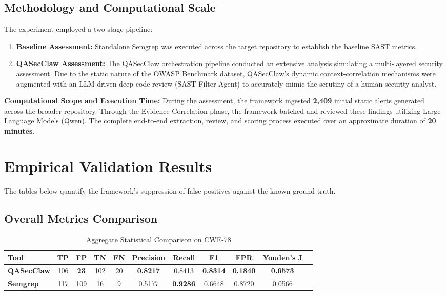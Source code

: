 \documentclass[11pt,a4paper]{article}
\begin{document}
\subsection{Methodology and Computational Scale}
The experiment employed a two-stage pipeline:
\begin{enumerate}
    \item \textbf{Baseline Assessment:} Standalone Semgrep was executed across the target repository to establish the baseline SAST metrics.
    \item \textbf{QASecClaw Assessment:} The QASecClaw orchestration pipeline conducted an extensive analysis simulating a multi-layered security assessment. Due to the static nature of the OWASP Benchmark dataset, QASecClaw's dynamic context-correlation mechanisms were augmented with an LLM-driven deep code review (SAST Filter Agent) to accurately mimic the scrutiny of a human security analyst.
\end{enumerate}

\textbf{Computational Scope and Execution Time:}
During the assessment, the framework ingested \textbf{2,409} initial static alerts generated across the broader repository. Through the Evidence Correlation phase, the framework batched and reviewed these findings utilizing Large Language Models (Qwen). The complete end-to-end extraction, review, and scoring process executed over an approximate duration of \textbf{20 minutes}.

\section{Empirical Validation Results}

The tables below quantify the framework's suppression of false positives against the known ground truth.

\subsection{Overall Metrics Comparison}
\begin{table}[h]
\centering
\begin{tabular}{lcccccccccc}
\toprule
\textbf{Tool} & \textbf{TP} & \textbf{FP} & \textbf{TN} & \textbf{FN} & \textbf{Precision} & \textbf{Recall} & \textbf{F1} & \textbf{FPR} & \textbf{Youden's J} \\
\midrule
\textbf{QASecClaw} & 106 & \textbf{23} & 102 & 20 & \textbf{0.8217} & 0.8413 & \textbf{0.8314} & \textbf{0.1840} & \textbf{0.6573} \\
\textbf{Semgrep} & 117 & 109 & 16 & 9  & 0.5177 & \textbf{0.9286} & 0.6648 & 0.8720 & 0.0566 \\
\bottomrule
\end{tabular}
\caption{Aggregate Statistical Comparison on CWE-78}
\end{table}
\end{document}
